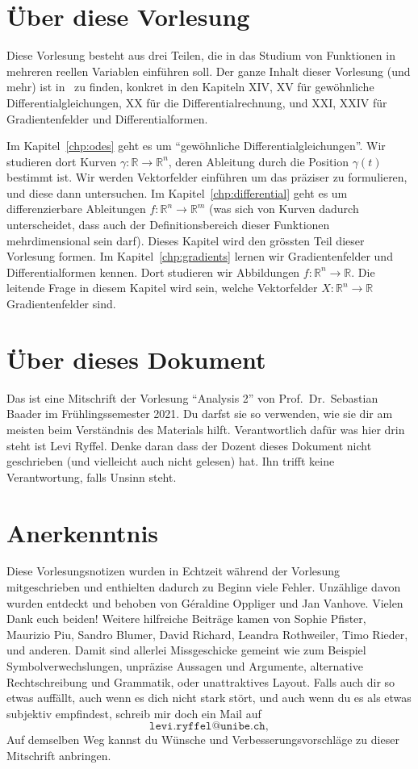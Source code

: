 \documentclass[../main.tex]{subfiles}
\begin{document}
\section*{Über diese Vorlesung}
Diese Vorlesung besteht aus drei Teilen,
die in das Studium von Funktionen
in mehreren reellen Variablen
einführen soll. Der ganze Inhalt
dieser Vorlesung (und mehr) ist in~\cite{heuser}
zu finden,
konkret in den Kapiteln XIV, XV für
gewöhnliche Differentialgleichungen,
XX für die Differentialrechnung,
und XXI, XXIV für Gradientenfelder
und Differentialformen.

Im Kapitel~\ref{chp:odes} geht es um
``gewöhnliche Differentialgleichungen''.
Wir studieren dort Kurven
$\gamma \colon \mathbb{R} \to \mathbb{R}^n$,
deren Ableitung durch die
Position $\gamma(t)$ bestimmt ist.
Wir werden Vektorfelder einführen
um das präziser zu formulieren,
und diese dann untersuchen.
Im Kapitel~\ref{chp:differential}
geht es um differenzierbare
Ableitungen
$f \colon \mathbb{R}^n \to \mathbb{R}^m$
(was sich von Kurven dadurch unterscheidet,
dass auch der Definitionsbereich
dieser Funktionen mehrdimensional sein darf).
Dieses Kapitel wird den grössten Teil
dieser Vorlesung formen.
Im Kapitel~\ref{chp:gradients} lernen
wir Gradientenfelder und Differentialformen
kennen. Dort studieren wir
Abbildungen $f \colon\mathbb{R}^n \to \mathbb{R}$.
Die leitende Frage in diesem Kapitel wird sein,
welche Vektorfelder $X \colon \mathbb{R}^n
\to \mathbb{R}$ Gradientenfelder sind.




\section*{Über dieses Dokument}
Das ist eine Mitschrift
der Vorlesung ``Analysis 2''
von Prof.\ Dr.\ Sebastian Baader
im Frühlingssemester 2021.
Du darfst sie so verwenden,
wie sie dir am meisten
beim Verständnis des Materials
hilft.
Verantwortlich dafür was
hier drin steht ist Levi Ryffel.
Denke daran dass der Dozent dieses Dokument
nicht geschrieben (und vielleicht auch nicht gelesen) hat.
Ihn trifft keine Verantwortung, falls
Unsinn steht.

\section*{Anerkenntnis}
Diese Vorlesungsnotizen wurden in Echtzeit während der Vorlesung mitgeschrieben
und enthielten dadurch zu Beginn viele Fehler.
Unzählige davon wurden entdeckt und behoben
von Géraldine Oppliger und Jan Vanhove.
Vielen Dank euch beiden! Weitere hilfreiche Beiträge kamen
von Sophie Pfister, Maurizio Piu, Sandro Blumer, David Richard, Leandra Rothweiler,
Timo Rieder, und anderen.
Damit sind allerlei Missgeschicke
gemeint wie zum Beispiel
Symbolverwechslungen, unpräzise Aussagen und Argumente,
alternative Rechtschreibung und Grammatik,
oder unattraktives Layout.
Falls auch dir so etwas auffällt,
auch wenn es dich nicht stark stört,
und auch wenn du es
als etwas subjektiv empfindest,
schreib mir doch ein Mail auf
\[
\texttt{levi.ryffel@unibe.ch},
\]
Auf demselben Weg kannst du Wünsche
und Verbesserungsvorschläge
zu dieser Mitschrift
anbringen.
\end{document}
